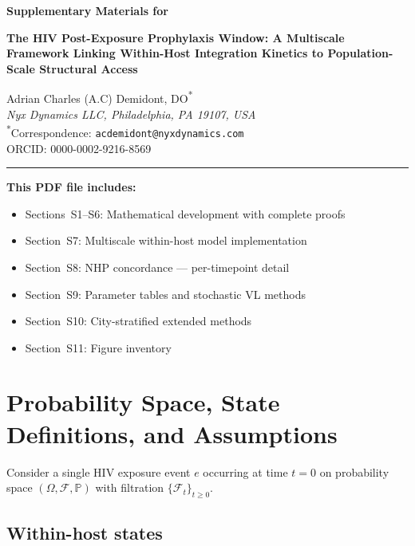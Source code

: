 \documentclass[11pt]{article}
\theoremstyle{definition}
\theoremstyle{remark}
\begin{document}
\begin{flushleft}
{\Large\bfseries Supplementary Materials for\par}
\vspace{0.3em}
{\large\bfseries The HIV Post-Exposure Prophylaxis Window:
A Multiscale Framework Linking Within-Host Integration Kinetics to Population-Scale Structural Access\par}
\vspace{0.8em}
Adrian Charles (A.C) Demidont, DO\textsuperscript{*}\\
\textit{Nyx Dynamics LLC, Philadelphia, PA 19107, USA}\\
\textsuperscript{*}Correspondence: \texttt{acdemidont@nyxdynamics.com}\\
ORCID: 0000-0002-9216-8569
\end{flushleft}

\vspace{0.5em}
\hrule
\vspace{0.5em}

\noindent\textbf{This PDF file includes:}
\begin{itemize}[leftmargin=2em,nosep]
    \item Sections~S1--S6: Mathematical development with complete proofs
    \item Section~S7: Multiscale within-host model implementation
    \item Section~S8: NHP concordance --- per-timepoint detail
    \item Section~S9: Parameter tables and stochastic VL methods
    \item Section~S10: City-stratified extended methods
    \item Section~S11: Figure inventory
\end{itemize}

\vspace{0.5em}



\section{Probability Space, State Definitions, and Assumptions}

Consider a single HIV exposure event $e$ occurring at time $t = 0$ on probability space $(\Omega, \mathcal{F}, \mathbb{P})$ with filtration $\{\mathcal{F}_{t}\}_{t \geq 0}$.

\subsection{Within-host states}
\end{document}

